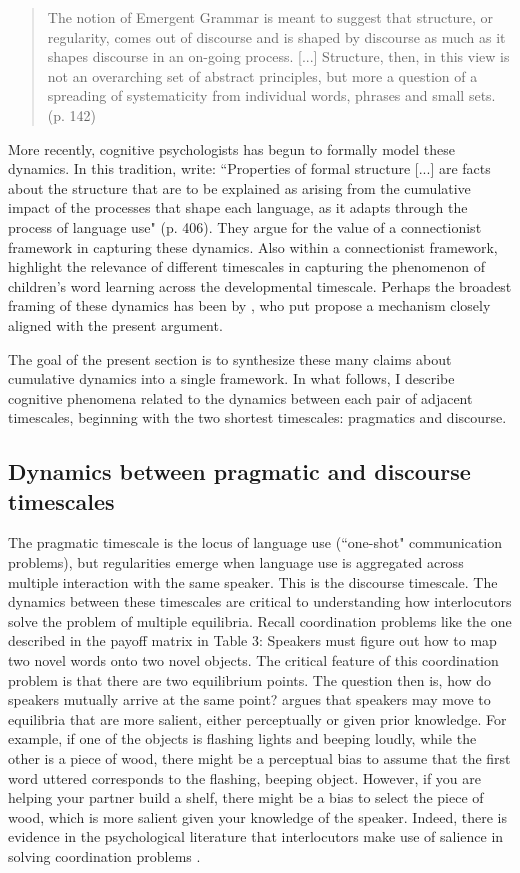 \documentclass[man, noapacite, 12pt]{apa2}
\begin{document}
\begin{quote} The notion of Emergent Grammar is meant to suggest that structure, or regularity, comes out of discourse and is shaped by discourse as much as it shapes discourse in an on-going process. [...] Structure, then, in this view is not an overarching set of abstract principles, but more a question of a spreading of systematicity from individual words, phrases and small sets. (p. 142)
\end{quote}
More recently, cognitive psychologists has begun to formally model these dynamics. In this tradition,  write: ``Properties of formal structure [...] are facts about the structure that are to be explained as arising from the cumulative impact of the processes that shape each language, as it adapts through the process of language use" (p. 406). They argue for the value of a connectionist framework in capturing these dynamics. Also within a  connectionist framework,  highlight the relevance of different timescales in capturing the phenomenon of children's word learning across the developmental timescale. Perhaps the broadest framing of these dynamics has been by , who put propose a mechanism closely aligned with the present argument.

The goal of the present section is to synthesize these many claims about cumulative dynamics into a single framework. In what follows, I describe cognitive phenomena related to the dynamics between each pair of adjacent timescales, beginning with the two shortest timescales: pragmatics and discourse. 

\subsection{Dynamics between pragmatic and discourse timescales} 
The pragmatic timescale is the locus of language use (``one-shot" communication problems), but regularities emerge when language use is aggregated across multiple interaction with the same speaker. This is the discourse timescale. The dynamics between these  timescales are critical to understanding how interlocutors solve the problem of multiple equilibria. Recall coordination problems like the one described in the payoff matrix in Table 3: Speakers must figure out how to map two novel words onto two novel objects. The critical feature of this coordination problem is that there are two equilibrium points. The question then is, how do speakers mutually arrive at the same point?  argues that speakers may move to equilibria that are more salient, either perceptually or given prior knowledge. For example, if one of the objects is flashing lights and beeping  loudly, while the other is a  piece of wood, there might be a perceptual bias to assume that the first word uttered corresponds to the flashing, beeping object.  However, if you are helping your partner build a shelf, there might be a bias to select the piece of wood, which is more salient given your knowledge of the speaker. Indeed, there is evidence in the psychological literature that interlocutors make use of salience in solving coordination problems \cite{clark1983common}. 
\end{document}
